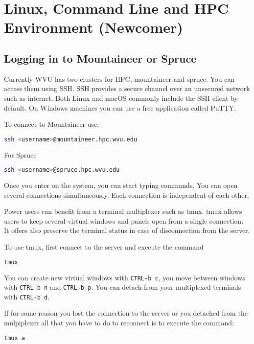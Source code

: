 \chapter{Linux, Command Line and HPC Environment (Newcomer)}


\section{Logging in to Mountaineer or Spruce}

Currently WVU has two clusters for HPC, mountaineer and spruce. You can access them using SSH.
SSH provides a secure channel over an unsecured network such as internet.
Both Linux and macOS commonly include the SSH client by default. On Windows machines you can use a free application called PuTTY.

To connect to Mountaineer use:

\begin{lstlisting}[language=bash]
ssh <username>@mountaineer.hpc.wvu.edu
\end{lstlisting}

For Spruce

\begin{lstlisting}[language=bash]
ssh <username>@spruce.hpc.wvu.edu
\end{lstlisting}

Once you enter on the system, you can start typing commands. You can open several connections simultaneously. Each connection is independent of each other.

Power users can benefit from a terminal multiplexer such as tmux. tmux allows users to keep several virtual windows and panels open from a single connection. It offers also preserve the terminal status in case of disconnection from the server.

To use tmux, first connect to the server and execute the command

\begin{lstlisting}[language=bash]
tmux
\end{lstlisting}

You can create new virtual windows with \texttt{CTRL-b c}, you move between windows with \texttt{CTRL-b n} and \texttt{CTRL-b p}. You can detach from your multiplexed terminals with \texttt{CTRL-b d}. 

If for some reason you lost the connection to the server or you detached from the mulpiplexer all that you have to do to reconnect is to execute the command:

\begin{lstlisting}[language=bash]
tmux a
\end{lstlisting}


